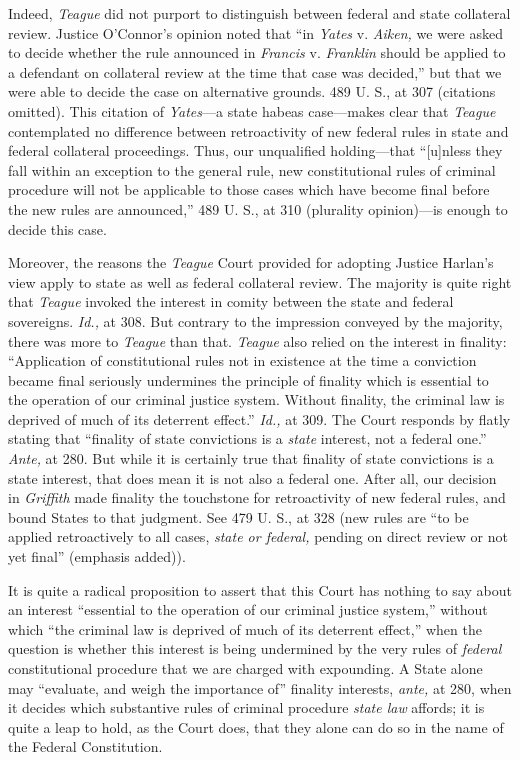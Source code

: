  Indeed, \emph{Teague} did not purport to distinguish between federal and state collateral review. Justice O'Connor's opinion \newpage noted that ``in \emph{Yates} v. \emph{Aiken,} we were asked to decide whether the rule announced in \emph{Francis} v. \emph{Franklin} should be applied to a defendant on collateral review at the time that case was decided,'' but that we were able to decide the case on alternative grounds. 489 U. S., at 307 (citations omitted). This citation of \emph{Yates}---a state habeas case---makes clear that \emph{Teague} contemplated no difference between retroactivity of new federal rules in state and federal collateral proceedings. Thus, our unqualified holding---that ``[u]nless they fall within an exception to the general rule, new constitutional rules of criminal procedure will not be applicable to those cases which have become final before the new rules are announced,'' 489 U. S., at 310 (plurality opinion)---is enough to decide this case.

  Moreover, the reasons the \emph{Teague} Court provided for adopting Justice Harlan's view apply to state as well as federal collateral review. The majority is quite right that \emph{Teague} invoked the interest in comity between the state and federal sovereigns. \emph{Id.,} at 308. But contrary to the impression conveyed by the majority, there was more to \emph{Teague} than that. \emph{Teague} also relied on the interest in finality: ``Application of constitutional rules not in existence at the time a conviction became final seriously undermines the principle of finality which is essential to the operation of our criminal justice system. Without finality, the criminal law is deprived of much of its deterrent effect.'' \emph{Id.,} at 309. The Court responds by flatly stating that ``finality of state convictions is a \emph{state} interest, not a federal one.'' \emph{Ante,} at 280. But while it is certainly true that finality of state convictions is a state interest, that does mean it is not also a federal one. After all, our decision in \emph{Griffith} made finality the touchstone for retroactivity of new federal rules, and bound States to that judgment. See 479 U. S., at 328 (new rules are ``to be applied retroactively to all cases, \emph{state or federal,} pending on direct review or not yet final'' (emphasis added)).\newpage 

  It is quite a radical proposition to assert that this Court has nothing to say about an interest ``essential to the operation of our criminal justice system,'' without which ``the criminal law is deprived of much of its deterrent effect,'' when the question is whether this interest is being undermined by the very rules of \emph{federal} constitutional procedure that we are charged with expounding. A State alone may ``evaluate, and weigh the importance of'' finality interests, \emph{ante,} at 280, when it decides which substantive rules of criminal procedure \emph{state law} affords; it is quite a leap to hold, as the Court does, that they alone can do so in the name of the Federal Constitution.

